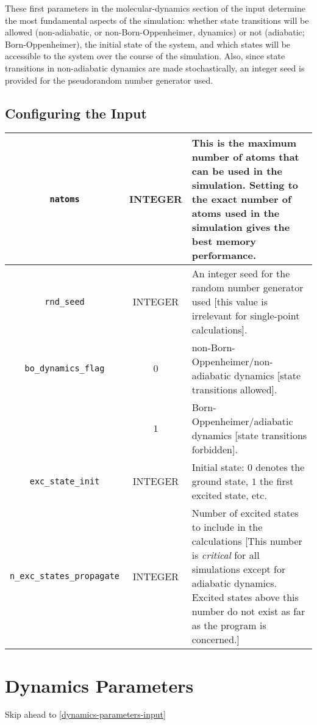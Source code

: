 \documentclass[12pt,letter,footinclude=true,headinclude=true,hyphens,oneside]{book} %
\begin{document}
    These first parameters in the molecular-dynamics section of the input determine the most fundamental aspects of the simulation: whether state transitions will be allowed (non-adiabatic, or non-Born-Oppenheimer, dynamics) or not (adiabatic; Born-Oppenheimer), the initial state of the system, and which states will be accessible to the system over the course of the simulation.
    Also, since state transitions in non-adiabatic dynamics are made stochastically, an integer seed is provided for the pseudorandom number generator used.
    
    \subsection{Configuring the Input}
    \label{general-parameters-input}
    
    \begin{tabular}{ | c | c | p{7cm} | }
    \hline
    \texttt{natoms} & INTEGER & This is the maximum number of atoms that can be used in the simulation. Setting to the exact number of atoms used in the simulation gives the best memory performance.\\
    \hline
    \texttt{rnd\_seed} & INTEGER & An integer seed for the random number generator used [this value is irrelevant for single-point calculations].\\
    \hline
    \texttt{bo\_dynamics\_flag} & $0$ & non-Born-Oppenheimer/non-adiabatic dynamics [state transitions allowed].\\
    & $1$ & Born-Oppenheimer/adiabatic dynamics [state transitions forbidden].\\
    \hline
    \texttt{exc\_state\_init} & INTEGER & Initial state: $0$ denotes the ground state, $1$ the first excited state, etc.\\
    \hline
    \texttt{n\_exc\_states\_propagate} & INTEGER & Number of excited states to include in the calculations [This number is \emph{critical} for all simulations except for adiabatic dynamics. Excited states above this number do not exist as far as the program is concerned.]\\
    \hline
    \end{tabular}
    
    \section{Dynamics Parameters}
    \label{dynamics-parameters}
    
    Skip ahead to \ref{dynamics-parameters-input}
    
\end{document}
